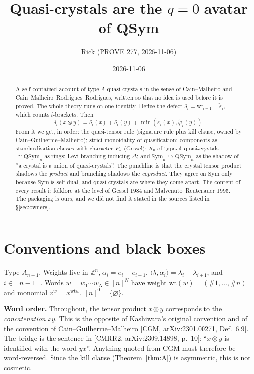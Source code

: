 \documentclass[11pt]{amsart}
\title{Quasi-crystals are the $q=0$ avatar of QSym}
\author{Rick (PROVE 277, 2026-11-06)}
\date{2026-11-06}
\theoremstyle{definition}
\theoremstyle{remark}
\newcommand{\teps}{\tilde\varepsilon}
\newcommand{\tphi}{\tilde\varphi}
\newcommand{\wt}{\mathrm{wt}}
\newcommand{\QSym}{\mathrm{QSym}}
\newcommand{\Sym}{\mathrm{Sym}}
\begin{document}
\begin{abstract}
A self-contained account of type-$A$ quasi-crystals in the sense of Cain--Malheiro and Cain--Malheiro--Rodrigues--Rodrigues, written so that no idea is used before it is proved. The whole theory runs on one identity. Define the defect $\delta_i=\wt_{i+1}-\teps_i$, which counts $i$-brackets. Then
\[\delta_i(x\otimes y)=\delta_i(x)+\delta_i(y)+\min(\teps_i(x),\tphi_i(y)).\]
From it we get, in order: the quasi-tensor rule (signature rule plus kill clause, owned by Cain--Guilherme--Malheiro); strict monoidality of quasification; components as standardisation classes with character $F_\alpha$ (Gessel); $K_0$ of type-$A$ quasi-crystals $\cong\QSym_n$ as rings; Levi branching inducing $\Delta$; and $\Sym_n\hookrightarrow\QSym_n$ as the shadow of ``a crystal is a union of quasi-crystals''. The punchline is that the crystal tensor product shadows the \emph{product} and branching shadows the \emph{coproduct}. They agree on $\Sym$ only because $\Sym$ is self-dual, and quasi-crystals are where they come apart. The content of every result is folklore at the level of Gessel 1984 and Malvenuto--Reutenauer 1995. The packaging is ours, and we did not find it stated in the sources listed in \S\ref{sec:owners}.
\end{abstract}
\maketitle
\tableofcontents

\section{Conventions and black boxes}

Type $A_{n-1}$. Weights live in $\mathbb Z^n$, $\alpha_i=e_i-e_{i+1}$, $\langle\lambda,\alpha_i\rangle=\lambda_i-\lambda_{i+1}$, and $i\in[n-1]$. Words $w=w_1\cdots w_N\in[n]^N$ have weight $\wt(w)=(\#1,\dots,\#n)$ and monomial $x^w=x^{\wt w}$. $[n]^0=\{\varnothing\}$.

\textbf{Word order.} Throughout, the tensor product $x\otimes y$ corresponds to the \emph{concatenation} $xy$. This is the opposite of Kashiwara's original convention and of the convention of Cain--Guilherme--Malheiro [CGM, arXiv:2301.00271, Def.~6.9]. The bridge is the sentence in [CMRR2, arXiv:2309.14898, p.~10]: ``$x\ddot\otimes y$ is identified with the word $yx$''. Anything quoted from CGM must therefore be word-reversed. Since the kill clause (Theorem~\ref{thm:A}) is asymmetric, this is not cosmetic.
\end{document}
